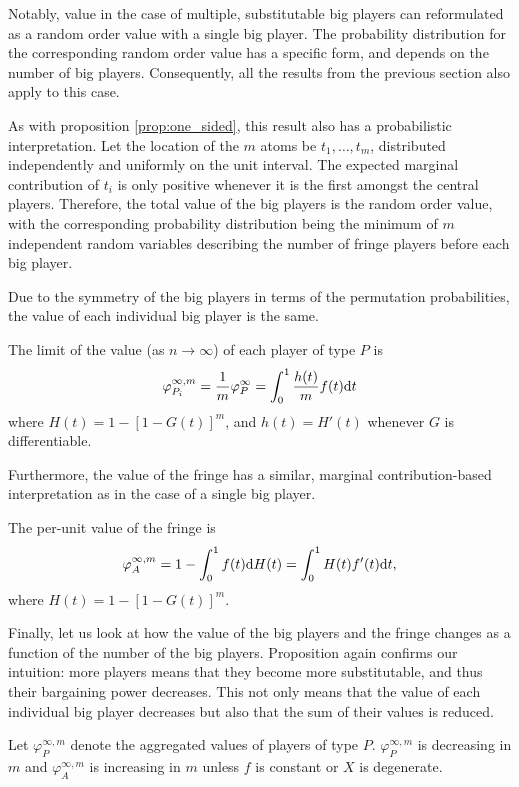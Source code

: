 Notably, value in the case of multiple, substitutable big players can reformulated as a random order value with a single big player.
The probability distribution for the corresponding random order value has a specific form, and depends on the number of big players.
Consequently, all the results from the previous section also apply to this case.

As with proposition \ref{prop:one_sided}, this result also has a probabilistic interpretation.
Let the location of the $m$ atoms be $t_1, \dots, t_m$, distributed independently and uniformly on the unit interval.
The expected marginal contribution of $t_i$ is only positive whenever it is the first amongst the central players.
Therefore, the total value of the big players is the random order value, with the corresponding probability distribution being the minimum of $m$ independent random variables describing the number of fringe players before each big player.

Due to the symmetry of the big players in terms of the permutation probabilities, the value of each individual big player is the same.
\begin{corollary}
    \label{prop:multiple_platforms_individual}
    The limit of the value (as $n \to \infty$) of each player of type $P$ is
    \begin{align*}
        \varphi_{P_i}^{\infty, m} = \frac{1}{m} \varphi_P^\infty = \int_0^1 \frac{h(t)}{m} f(t) \mathrm{d}t
    \end{align*}
    where $H(t) = 1 - [1 - G(t)]^m$, and $h(t) = H'(t)$ whenever $G$ is differentiable.
\end{corollary}
Furthermore, the value of the fringe has a similar, marginal contribution-based interpretation as in the case of a single big player.
\begin{corollary}
    \label{cor:multiple_platforms}
    The per-unit value of the fringe is
    \begin{align*}
        \varphi_A^{\infty, m} = 1 - \int_0^1 f(t) \mathrm{d}H(t) = \int_0^1 H(t) f'(t) \mathrm{d}t,
    \end{align*}
    where $H(t) = 1 - [1 - G(t)]^m$.
\end{corollary}

Finally, let us look at how the value of the big players and the fringe changes as a function of the number of the big players.
Proposition  again confirms our intuition: more players means that they become more substitutable, and thus their bargaining power decreases.
This not only means that the value of each individual big player decreases but also that the sum of their values is reduced.
\begin{corollary}
    \label{cor:multiple_platforms_2}
    Let $\varphi_{P}^{\infty, m}$ denote the aggregated values of players of type $P$. $\varphi_{P}^{\infty, m}$ is decreasing in $m$ and $\varphi_{A}^{\infty, m}$ is increasing in $m$ unless $f$ is constant or $X$ is degenerate.
\end{corollary}

